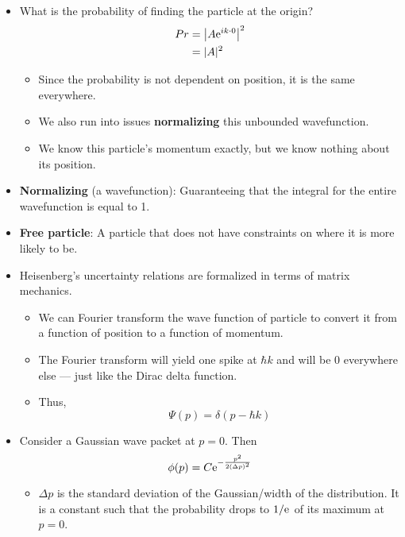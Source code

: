 \documentclass[../notes.tex]{subfiles}
\begin{document}
\begin{itemize}
\begin{itemize}
    \end{itemize}
    \item What is the probability of finding the particle at the origin?
    \begin{align*}
        Pr &= \left| A\e[ik\cdot 0] \right|^2\\
        &= |A|^2\\
    \end{align*}
    \begin{itemize}
        \item Since the probability is not dependent on position, it is the same everywhere.
        \item We also run into issues \textbf{normalizing} this unbounded wavefunction.
        \item We know this particle's momentum exactly, but we know nothing about its position.
    \end{itemize}
    \item \textbf{Normalizing} (a wavefunction): Guaranteeing that the integral for the entire wavefunction is equal to 1.
    \item \textbf{Free particle}: A particle that does not have constraints on where it is more likely to be.
    \item Heisenberg's uncertainty relations are formalized in terms of matrix mechanics.
    \begin{itemize}
        \item We can Fourier transform the wave function of particle to convert it from a function of position to a function of momentum.
        \item The Fourier transform will yield one spike at $\hbar k$ and will be 0 everywhere else --- just like the Dirac delta function.
        \item Thus,
        \begin{equation*}
            \Psi(p) = \delta(p-\hbar k)
        \end{equation*}
    \end{itemize}
    \item Consider a Gaussian wave packet at $p=0$. Then
    \begin{equation*}
        \phi(p) = C\e[-\frac{p^2}{2(\Delta p)^2}]
    \end{equation*}
    \begin{itemize}
        \item $\Delta p$ is the standard deviation of the Gaussian/width of the distribution. It is a constant such that the probability drops to $1/\e$ of its maximum at $p=0$.

\end{itemize}
\end{itemize}
\end{document}
